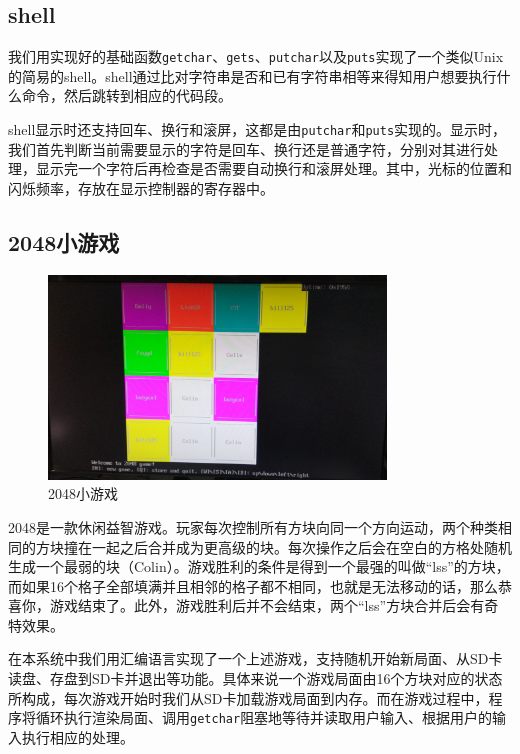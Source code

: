 \documentclass[11pt,utf8]{report}
\begin{document}
\subsection{shell}
	\par 我们用实现好的基础函数\texttt{getchar}、\texttt{gets}、\texttt{putchar}以及\texttt{puts}实现了一个类似Unix的简易的shell。shell通过比对字符串是否和已有字符串相等来得知用户想要执行什么命令，然后跳转到相应的代码段。
	\par shell显示时还支持回车、换行和滚屏，这都是由\texttt{putchar}和\texttt{puts}实现的。显示时，我们首先判断当前需要显示的字符是回车、换行还是普通字符，分别对其进行处理，显示完一个字符后再检查是否需要自动换行和滚屏处理。其中，光标的位置和闪烁频率，存放在显示控制器的寄存器中。

\subsection{2048小游戏}
	\begin{center}
	\begin{figure}[H]
			\centering
			\includegraphics[width=0.8\textwidth]{2048.jpg}
			\caption{2048小游戏}
		\end{figure}
	\end{center}

2048是一款休闲益智游戏。玩家每次控制所有方块向同一个方向运动，两个种类相同的方块撞在一起之后合并成为更高级的块。每次操作之后会在空白的方格处随机生成一个最弱的块（Colin）。游戏胜利的条件是得到一个最强的叫做“lss”的方块，而如果16个格子全部填满并且相邻的格子都不相同，也就是无法移动的话，那么恭喜你，游戏结束了。此外，游戏胜利后并不会结束，两个“lss”方块合并后会有奇特效果。

在本系统中我们用汇编语言实现了一个上述游戏，支持随机开始新局面、从SD卡读盘、存盘到SD卡并退出等功能。具体来说一个游戏局面由16个方块对应的状态所构成，每次游戏开始时我们从SD卡加载游戏局面到内存。而在游戏过程中，程序将循环执行渲染局面、调用\texttt{getchar}阻塞地等待并读取用户输入、根据用户的输入执行相应的处理。
\end{document}
